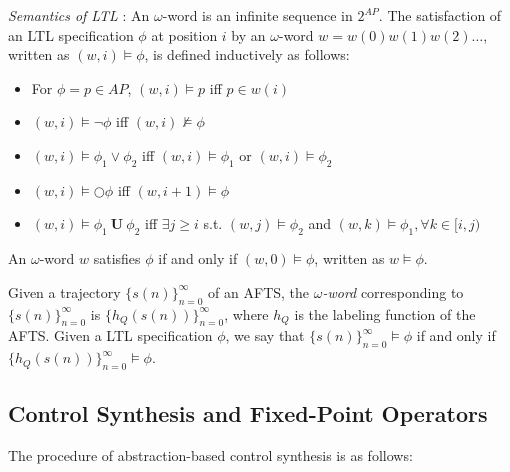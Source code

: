 {\color{black}\emph{Semantics of LTL} \cite{Nilsson2017}:} An $\omega$-word is an infinite sequence in $ 2^{AP}$.  The satisfaction of an LTL specification $ \phi $ at position $i$ by an $\omega$-word $ w = w(0)w(1)w(2)\dots $, written as $ (w,i) \models \phi $, is defined inductively as follows:
\begin{itemize}
	\item For $ \phi = p \in AP $, $ (w,i)\models p $ iff $ p\in w(i) $ 
	\item $ (w,i)\models \neg \phi $ iff $ (w,i)\not\models \phi $
	\item $ (w,i)\models  \phi_1 \vee \phi_2 $ iff $ (w,i)\models \phi_1 $ or $ (w,i)\models \phi_2 $
	\item $ (w,i) \models \bigcirc \phi $ iff $ (w,i+1) \models \phi $
	\item $ (w,i)\models \phi_1 \mathbf{\ U\ } \phi_2 $ iff $\exists j\geq i  $ s.t. $ (w,j)\models \phi_2 $ and $ (w,k)\models \phi_1, \forall k\in [i,j) $
\end{itemize} 

An $\omega$-word $ w $ satisfies $ \phi $ if and only if $ (w,0)\models \phi $, written as $ w \models \phi $. 


{\color{black} Given a trajectory $\{s(n)\}_{n=0}^{\infty} $ }
of an AFTS, the \textit{$\omega$-word} corresponding to {\color{black} $\{s(n)\}_{n=0}^{\infty} $} is {\color{black} $\{h_Q(s(n))\}_{n=0}^{\infty}$}, where $ h_Q $ is the labeling function of the AFTS.  Given a LTL specification $ \phi $, we say that {\color{black} $\{s(n)\}_{n=0}^{\infty} \models \phi $} if and only if {\color{black} $\{h_Q(s(n))\}_{n=0}^{\infty} \models \phi $}.

\subsection{Control Synthesis and Fixed-Point Operators}
\label{sec:contsyn}
\iffalse
The procedure of abstraction-based control synthesis is as follows: 

